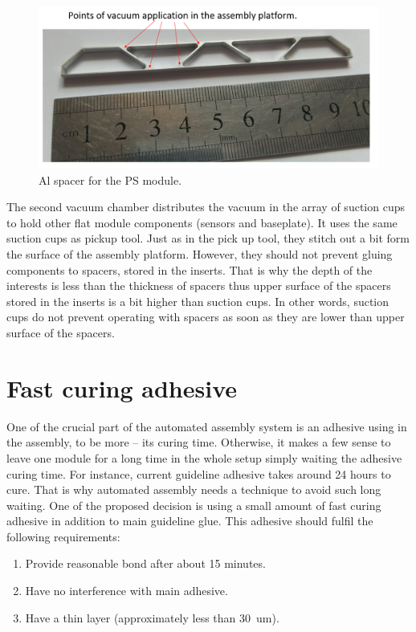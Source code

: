\begin{figure}[ht]\centering
\includegraphics[width=0.7\linewidth]{Data/Module_assembly/Al_spacer.png}
\caption{Al spacer for the PS module.}
\label{fig:al_spacer}
\end{figure}

The second vacuum chamber distributes the vacuum in the array of suction cups to hold other flat module components (sensors and baseplate). It uses the same suction cups as pickup tool. Just as in the pick up tool, they stitch out a bit form the surface of the assembly platform. However, they should not prevent gluing components to spacers, stored in the inserts. That is why the depth of the interests is less than the thickness of spacers thus upper surface of the spacers stored in the inserts is a bit higher than suction cups. In other words, suction cups do not prevent operating with spacers as soon as they are lower than upper surface of the spacers.

\section{Fast curing adhesive}

One of the crucial part of the automated assembly system is an adhesive using in the assembly, to be more  -- its curing time. Otherwise, it makes a few sense to leave one module for a long time in the whole setup simply waiting the adhesive curing time. For instance, current guideline adhesive takes around 24 hours to cure. That is why automated assembly needs a technique to avoid such long waiting. One of the proposed decision is using a small amount of fast curing adhesive in addition to main guideline glue. This adhesive should fulfil the following requirements:

\begin{enumerate}
\setlength\itemsep{-0.5em}
\item Provide reasonable bond after about 15 minutes.
\item Have no interference with main adhesive.
\item Have a thin layer (approximately less than 30~um).
\end{enumerate}

